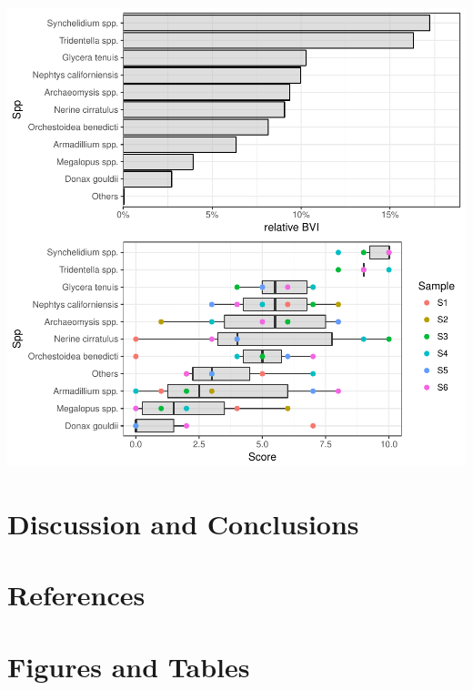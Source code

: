 \documentclass[12pt,]{article}
\begin{document}
\includegraphics{BVI_Manuscript_files/figure-latex/unnamed-chunk-8-1.pdf}

\section{Discussion and Conclusions}\label{discussion-and-conclusions}

\section{References}\label{references}

\hypertarget{refs}{}

\section{Figures and Tables}\label{figures-and-tables}
\end{document}
